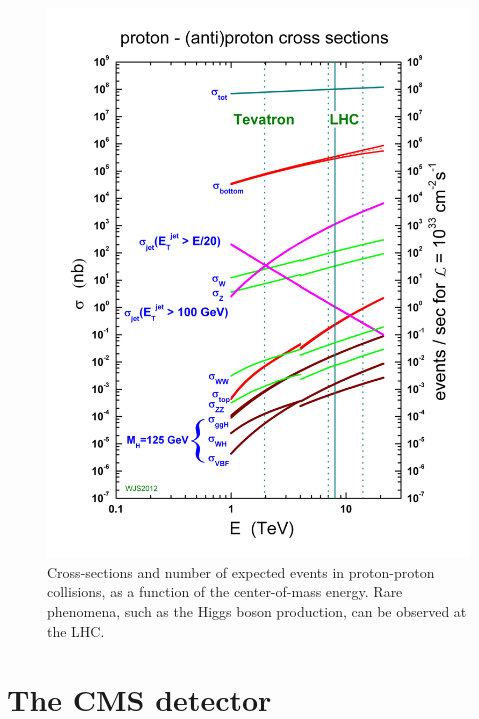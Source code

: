 \begin{figure}[!htb]
  \centering
    \includegraphics[width=.5\textwidth]{figures/crosssections2013.jpg}
  \caption{Cross-sections and number of expected events in proton-proton collisions, as a function of the center-of-mass energy. Rare phenomena, such as the Higgs boson production, can be observed at the LHC.}
  \label{fig:LHC_pp_cross_section}
\end{figure}

\section{The CMS detector}

